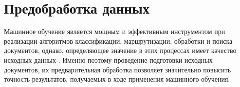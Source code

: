 \chapter{Предобработка данных}

Машинное обучение является мощным и эффективным инструментом при реализации
алгоритмов классификации, маршрутизации, обработки и поиска документов, однако, определяющее значение в этих процессах имеет качество исходных данных \cite{bib2}. Именно поэтому проведение подготовки исходных документов, их предварительная обработка позволяет значительно повысить точность результатов, получаемых в ходе применения
машинного обучения. 






% 
%
%
%
%
%
%